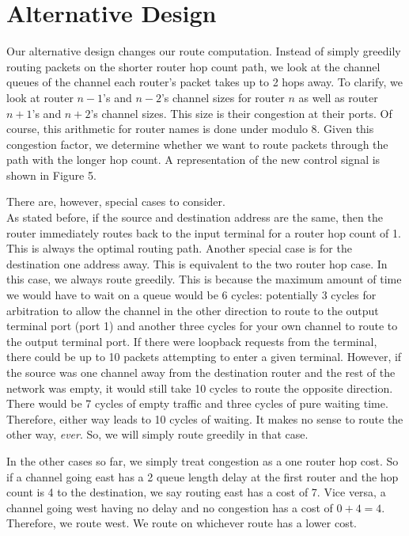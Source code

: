 \documentclass[10pt]{article}
\begin{document}
\section{Alternative Design}

Our alternative design changes our route computation. 
Instead of simply greedily routing packets on the shorter router hop count
path, we look at the channel queues of the channel each router's packet 
takes up to 2 hops away. 
To clarify, we look at router $n-1$'s and $n-2$'s channel sizes 
for router $n$ as well as router $n+1$'s and $n+2$'s channel sizes.
This size is their congestion at their ports. 
Of course, this arithmetic for router names is done under modulo 8. 
Given this congestion factor, we determine whether we want to route packets 
through the path with the longer hop count. 
A representation of the new control signal is shown in Figure 5.\par

There are, however, special cases to consider. \\
As stated before, if the source and destination address are the same, then the
router immediately routes back to the input terminal for a router hop count 
of 1.
This is always the optimal routing path.
Another special case is for the destination one address away. 
This is equivalent to the two router hop case.
In this case, we always route greedily. 
This is because the maximum amount of time we would have to wait on a queue
would be 6 cycles: 
potentially 3 cycles for arbitration to allow the channel in the other 
direction to route to the output terminal port (port 1) and another three
cycles for your own channel to route to the output terminal port.
If there were loopback requests from the terminal, there could be up to 10 
packets attempting to enter a given terminal.
However, if the source was one channel away from the destination router and the
rest of the network was empty, it would still take 10 cycles to route the 
opposite direction. 
There would be 7 cycles of empty traffic and three cycles of pure waiting time.
Therefore, either way leads to 10 cycles of waiting.
It makes no sense to route the other way, \textit{ever}.
So, we will simply route greedily in that case. \par

In the other cases so far, we simply treat congestion as a one router hop 
cost.
So if a channel going east has a 2 queue length delay at the first router 
and the hop count is 4 to the destination, we say routing east has a cost of 7.
Vice versa, a channel going west having no delay and no congestion has a cost
of $ 0 + 4 =4 $. 
Therefore, we route west. 
We route on whichever route has a lower cost. \par
\end{document}
